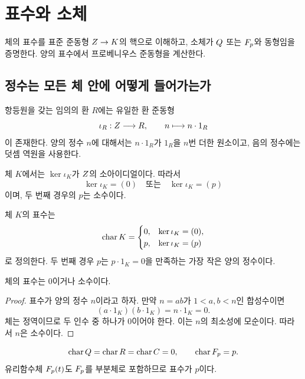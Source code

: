 \section{표수와 소체}
\label{sec:characteristic-prime-field}

\begin{learninggoal}
체의 표수를 표준 준동형 $Z\to K$의 핵으로 이해하고, 소체가 $Q$ 또는 $F_p$와 동형임을 증명한다. 양의 표수에서 프로베니우스 준동형을 계산한다.
\end{learninggoal}

\subsection{정수는 모든 체 안에 어떻게 들어가는가}

항등원을 갖는 임의의 환 $R$에는 유일한 환 준동형
\[
  \iota_R:Z\longrightarrow R,
  \qquad
  n\longmapsto n\cdot1_R
\]
이 존재한다. 양의 정수 $n$에 대해서는 $n\cdot1_R$가 $1_R$을 $n$번 더한 원소이고, 음의 정수에는 덧셈 역원을 사용한다.

체 $K$에서는 $\ker\iota_K$가 $Z$의 소아이디얼이다. 따라서
\[
  \ker\iota_K=(0)
  \quad\text{또는}\quad
  \ker\iota_K=(p)
\]
이며, 두 번째 경우의 $p$는 소수이다.

\begin{definition}[표수]
체 $K$의 표수는
\[
  \operatorname{char} K=
  \begin{cases}
    0,&\ker\iota_K=(0),\\
    p,&\ker\iota_K=(p)
  \end{cases}
\]
로 정의한다. 두 번째 경우 $p$는 $p\cdot1_K=0$을 만족하는 가장 작은 양의 정수이다.
\end{definition}

\begin{theorem}
체의 표수는 $0$이거나 소수이다.
\end{theorem}

\begin{proof}
표수가 양의 정수 $n$이라고 하자. 만약 $n=ab$가 $1<a,b<n$인 합성수이면
\[
  (a\cdot1_K)(b\cdot1_K)=n\cdot1_K=0.
\]
체는 정역이므로 두 인수 중 하나가 $0$이어야 한다. 이는 $n$의 최소성에 모순이다. 따라서 $n$은 소수이다.
\end{proof}

\begin{example}
\[
  \operatorname{char}Q=\operatorname{char}R=\operatorname{char}C=0,
  \qquad
  \operatorname{char}F_p=p.
\]
유리함수체 $F_p(t)$도 $F_p$를 부분체로 포함하므로 표수가 $p$이다.
\end{example}

